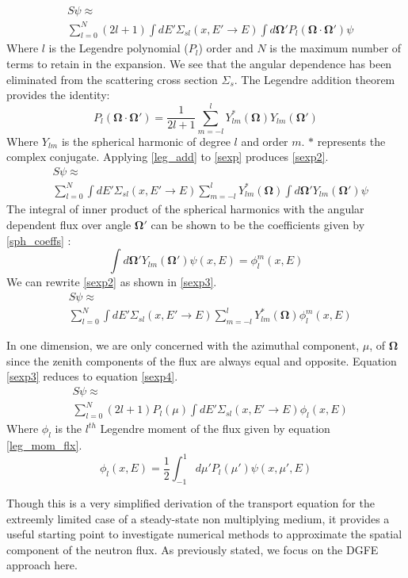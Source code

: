 \begin{eqnarray}
& S\psi \approx \nonumber \\
& \sum_{l=0}^N (2l+1) \int dE' \Sigma_{sl}(x, E'\rightarrow E)
  \int d\mathbf\Omega' P_l(\mathbf\Omega \cdot \mathbf{\Omega'}) \psi
\label{sexp}
\end{eqnarray}
Where $l$ is the Legendre polynomial ($P_l$) order and $N$ is the maximum number of terms to retain in the expansion.  We see that the angular dependence has been eliminated from the scattering cross section $\Sigma_s$.
The Legendre addition theorem provides the identity:
\begin{equation}
P_l(\mathbf\Omega \cdot \mathbf{\Omega'}) = \frac{1}{2l+1}
\sum_{m=-l}^{l} Y^{*}_{lm}(\mathbf\Omega) Y_{lm}(\mathbf\Omega')
\label{leg_add}
\end{equation}
Where $Y_{lm}$ is the spherical harmonic of degree $l$ and order $m$.  $*$ represents the complex conjugate.  Applying \ref{leg_add} to \ref{sexp} produces \ref{sexp2}.
\begin{eqnarray}
& S\psi \approx \nonumber \\
& \sum_{l=0}^N \int dE' \Sigma_{sl}(x, E'\rightarrow E) \sum_{m=-l}^{l} Y^{*}_{lm}(\mathbf\Omega)
  \int d\mathbf\Omega' Y_{lm}(\mathbf\Omega') \psi
\label{sexp2}
\end{eqnarray}
The integral of inner product of the spherical harmonics with the angular dependent flux over angle $\mathbf\Omega'$ can be shown to be the coefficients given by \ref{sph_coeffs} \cite{Lewis}:
\begin{equation}
\int d\mathbf\Omega' Y_{lm}(\mathbf\Omega') \psi(x, E) = \phi_l^m(x, E)
\label{sph_coeffs}
\end{equation}
We can rewrite \ref{sexp2} as shown in \ref{sexp3}.
\begin{eqnarray}
& S\psi \approx \nonumber \\
& \sum_{l=0}^N \int dE' \Sigma_{sl}(x, E'\rightarrow E) \sum_{m=-l}^{l} Y^{*}_{lm}(\mathbf\Omega) \phi_l^m(x, E)
\label{sexp3}
\end{eqnarray}

In one dimension, we are only concerned with the azimuthal component, $\mu$, of $\mathbf\Omega$ since the zenith components of the flux are always equal and opposite.  Equation \ref{sexp3} reduces to equation \ref{sexp4}.
\begin{eqnarray}
& S\psi \approx \nonumber \\
& \sum_{l=0}^N (2l+1) P_l(\mu) \int dE' \Sigma_{sl}(x, E'\rightarrow E) \phi_l(x, E)
\label{sexp4}
\end{eqnarray}
Where $\phi_l$ is the $l^{th}$ Legendre moment of the flux given by equation \ref{leg_mom_flx}.
\begin{equation}
\phi_l(x,E) = \frac{1}{2} \int_{-1}^1 d\mu' P_l(\mu') \psi(x, \mu', E)
\label{leg_mom_flx}
\end{equation}

Though this is a very simplified derivation of the transport equation for the extreemly limited case of a steady-state non multiplying medium, it provides a useful starting point to investigate numerical methods to approximate the spatial component of the neutron flux.
As previously stated, we focus on the DGFE approach here.
